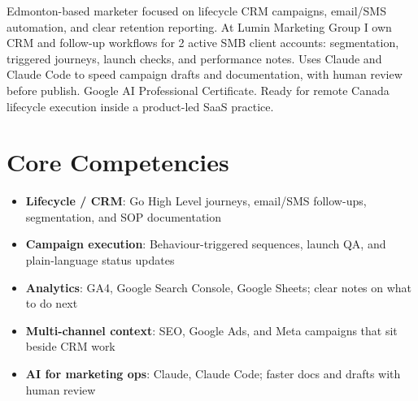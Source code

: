 \documentclass[11pt,a4paper,sans]{moderncv}
\begin{document}
\makecvtitle

\vspace{6pt}
\small{Edmonton-based marketer focused on lifecycle CRM campaigns, email/SMS automation, and clear retention reporting. At Lumin Marketing Group I own CRM and follow-up workflows for 2 active SMB client accounts: segmentation, triggered journeys, launch checks, and performance notes. Uses Claude and Claude Code to speed campaign drafts and documentation, with human review before publish. Google AI Professional Certificate. Ready for remote Canada lifecycle execution inside a product-led SaaS practice.}

\section{Core Competencies}
\vspace{1pt}
\begin{itemize}
\item \textbf{Lifecycle / CRM}: Go High Level journeys, email/SMS follow-ups, segmentation, and SOP documentation
\item \textbf{Campaign execution}: Behaviour-triggered sequences, launch QA, and plain-language status updates
\item \textbf{Analytics}: GA4, Google Search Console, Google Sheets; clear notes on what to do next
\item \textbf{Multi-channel context}: SEO, Google Ads, and Meta campaigns that sit beside CRM work
\item \textbf{AI for marketing ops}: Claude, Claude Code; faster docs and drafts with human review
\end{itemize}
\end{document}
